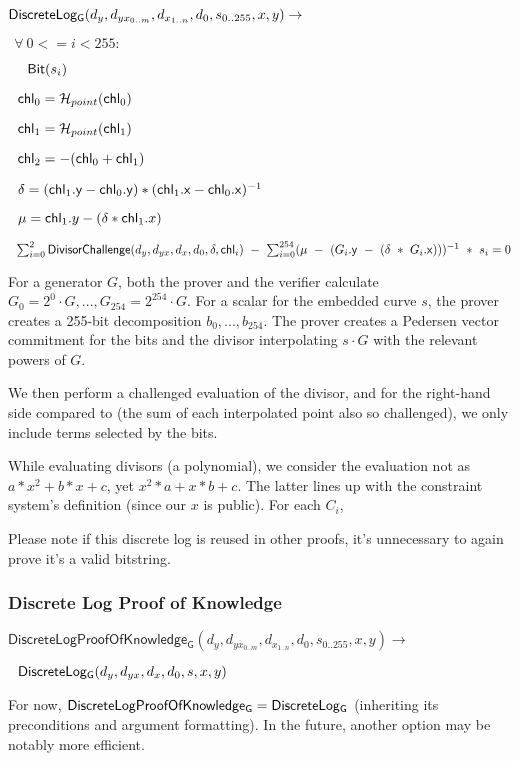 \documentclass[]{article}
\begin{document}
$\mathsf{DiscreteLog_{G}}(d_y, d_{yx_{0..m}}, d_{x_{1..n}}, d_0, s_{0..255}, x, y) \rightarrow$

$~~\forall ~0 <= i < 255:$

$~~~~\mathsf{Bit}(s_i)$

$~~\mathsf{chl}_0 = \mathcal{H}_{point}(\mathsf{chl}_0)$

$~~\mathsf{chl}_1 = \mathcal{H}_{point}(\mathsf{chl}_1)$

$~~\mathsf{chl}_2 = -(\mathsf{chl}_0 + \mathsf{chl}_1)$

$~~\delta = (\mathsf{chl}_1\mathsf{.y} - \mathsf{chl}_0\mathsf{.y}) * (\mathsf{chl}_1\mathsf{.x} - \mathsf{chl}_0\mathsf{.x})^{-1}$

$~~\mu = \mathsf{chl}_1.y - (\delta * \mathsf{chl}_1.x)$

$~~\sum^2_{i=0} \mathsf{DivisorChallenge}(d_y, d_{yx}, d_x, d_0, \delta, \mathsf{chl}_i) ~-~ \sum^{254}_{i=0} (\mu ~-~ (G_i\mathsf{.y} ~-~ (\delta ~*~ G_i\mathsf{.x})))^{-1} ~*~ s_i = 0$

For a generator $G$, both the prover and the verifier calculate $G_0 = 2^0 \cdot G, ...,G_{254} = 2^{254} \cdot G$. For a scalar for the embedded curve $s$, the prover creates a 255-bit decomposition $b_0, ..., b_{254}$. The prover creates a Pedersen vector commitment for the bits and the divisor interpolating $s \cdot G$ with the relevant powers of $G$.

We then perform a challenged evaluation of the divisor, and for the right-hand side compared to (the sum of each interpolated point also so challenged), we only include terms selected by the bits.

While evaluating divisors (a polynomial), we consider the evaluation not as $a * x^2 + b * x + c$, yet $x^2 * a + x * b + c$. The latter lines up with the constraint system's definition (since our $x$ is public).
For each $C_i$,

Please note if this discrete log is reused in other proofs, it's unnecessary to again prove it's a valid bitstring.

\subsubsection{Discrete Log Proof of Knowledge}

\newcommand{\dlogpok}{\mathsf{DiscreteLogProofOfKnowledge_G}}

$\dlogpok(d_y, d_{yx_{0..m}}, d_{x_{1..n}}, d_0, s_{0..255}, x, y) \rightarrow$

$~~\mathsf{DiscreteLog_{G}}(d_y, d_{yx}, d_x, d_0, s, x, y)$

For now, $\dlogpok = \dlog$ (inheriting its preconditions and argument formatting). In the future, another option may be notably more efficient.
\end{document}

